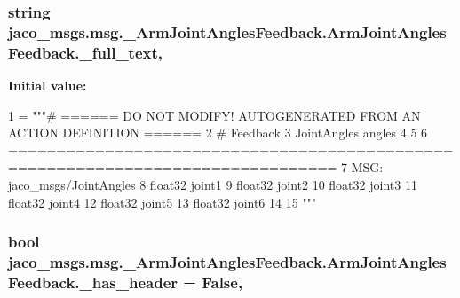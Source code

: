 \subsubsection[{\texorpdfstring{\+\_\+full\+\_\+text}{_full_text}}]{\setlength{\rightskip}{0pt plus 5cm}string jaco\+\_\+msgs.\+msg.\+\_\+\+Arm\+Joint\+Angles\+Feedback.\+Arm\+Joint\+Angles\+Feedback.\+\_\+full\+\_\+text\hspace{0.3cm}{\ttfamily [static]}, {\ttfamily [private]}}\hypertarget{classjaco__msgs_1_1msg_1_1__ArmJointAnglesFeedback_1_1ArmJointAnglesFeedback_a7e129402f2fc39b86b543a3eb2542597}{}\label{classjaco__msgs_1_1msg_1_1__ArmJointAnglesFeedback_1_1ArmJointAnglesFeedback_a7e129402f2fc39b86b543a3eb2542597}
{\bfseries Initial value\+:}
\begin{DoxyCode}
1 = \textcolor{stringliteral}{"""# ====== DO NOT MODIFY! AUTOGENERATED FROM AN ACTION DEFINITION ======}
2 \textcolor{stringliteral}{# Feedback}
3 \textcolor{stringliteral}{JointAngles angles}
4 \textcolor{stringliteral}{}
5 \textcolor{stringliteral}{}
6 \textcolor{stringliteral}{================================================================================}
7 \textcolor{stringliteral}{MSG: jaco\_msgs/JointAngles}
8 \textcolor{stringliteral}{float32 joint1}
9 \textcolor{stringliteral}{float32 joint2}
10 \textcolor{stringliteral}{float32 joint3}
11 \textcolor{stringliteral}{float32 joint4}
12 \textcolor{stringliteral}{float32 joint5}
13 \textcolor{stringliteral}{float32 joint6}
14 \textcolor{stringliteral}{}
15 \textcolor{stringliteral}{"""}
\end{DoxyCode}
\subsubsection[{\texorpdfstring{\+\_\+has\+\_\+header}{_has_header}}]{\setlength{\rightskip}{0pt plus 5cm}bool jaco\+\_\+msgs.\+msg.\+\_\+\+Arm\+Joint\+Angles\+Feedback.\+Arm\+Joint\+Angles\+Feedback.\+\_\+has\+\_\+header = False\hspace{0.3cm}{\ttfamily [static]}, {\ttfamily [private]}}\hypertarget{classjaco__msgs_1_1msg_1_1__ArmJointAnglesFeedback_1_1ArmJointAnglesFeedback_acaa4fe73269bd0a73f18bc0cbcb72193}{}\label{classjaco__msgs_1_1msg_1_1__ArmJointAnglesFeedback_1_1ArmJointAnglesFeedback_acaa4fe73269bd0a73f18bc0cbcb72193}
